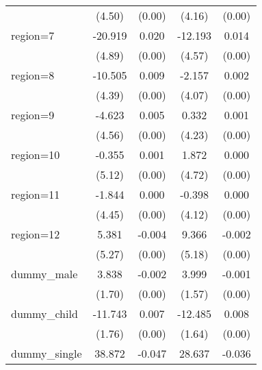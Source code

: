 \begin{table}[htbp]
\begin{tabular}{l*{4}{c}}
                    &      (4.50)         &      (0.00)         &      (4.16)         &      (0.00)         \\
region=7            &     -20.919\sym{***}&       0.020\sym{***}&     -12.193\sym{**} &       0.014\sym{***}\\
                    &      (4.89)         &      (0.00)         &      (4.57)         &      (0.00)         \\
region=8            &     -10.505\sym{*}  &       0.009\sym{*}  &      -2.157         &       0.002         \\
                    &      (4.39)         &      (0.00)         &      (4.07)         &      (0.00)         \\
region=9            &      -4.623         &       0.005         &       0.332         &       0.001         \\
                    &      (4.56)         &      (0.00)         &      (4.23)         &      (0.00)         \\
region=10           &      -0.355         &       0.001         &       1.872         &       0.000         \\
                    &      (5.12)         &      (0.00)         &      (4.72)         &      (0.00)         \\
region=11           &      -1.844         &       0.000         &      -0.398         &       0.000         \\
                    &      (4.45)         &      (0.00)         &      (4.12)         &      (0.00)         \\
region=12           &       5.381         &      -0.004         &       9.366         &      -0.002         \\
                    &      (5.27)         &      (0.00)         &      (5.18)         &      (0.00)         \\
dummy\_male          &       3.838\sym{*}  &      -0.002         &       3.999\sym{*}  &      -0.001         \\
                    &      (1.70)         &      (0.00)         &      (1.57)         &      (0.00)         \\
dummy\_child         &     -11.743\sym{***}&       0.007\sym{***}&     -12.485\sym{***}&       0.008\sym{***}\\
                    &      (1.76)         &      (0.00)         &      (1.64)         &      (0.00)         \\
dummy\_single        &      38.872\sym{***}&      -0.047\sym{***}&      28.637\sym{***}&      -0.036\sym{***}\\

\end{tabular}
\end{table}

